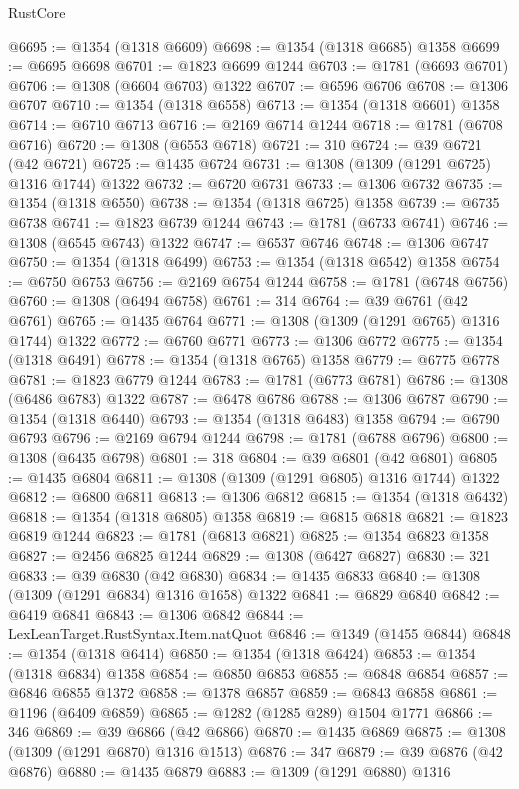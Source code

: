 \begin{lexlean}{RustCore}
\begin{coremodule}
@6695 := @1354 (@1318 @6609)
@6698 := @1354 (@1318 @6685) @1358
@6699 := @6695 @6698
@6701 := @1823 @6699 @1244
@6703 := @1781 (@6693 @6701)
@6706 := @1308 (@6604 @6703) @1322
@6707 := @6596 @6706
@6708 := @1306 @6707
@6710 := @1354 (@1318 @6558)
@6713 := @1354 (@1318 @6601) @1358
@6714 := @6710 @6713
@6716 := @2169 @6714 @1244
@6718 := @1781 (@6708 @6716)
@6720 := @1308 (@6553 @6718)
@6721 := 310
@6724 := @39 @6721 (@42 @6721)
@6725 := @1435 @6724
@6731 := @1308 (@1309 (@1291 @6725) @1316 @1744) @1322
@6732 := @6720 @6731
@6733 := @1306 @6732
@6735 := @1354 (@1318 @6550)
@6738 := @1354 (@1318 @6725) @1358
@6739 := @6735 @6738
@6741 := @1823 @6739 @1244
@6743 := @1781 (@6733 @6741)
@6746 := @1308 (@6545 @6743) @1322
@6747 := @6537 @6746
@6748 := @1306 @6747
@6750 := @1354 (@1318 @6499)
@6753 := @1354 (@1318 @6542) @1358
@6754 := @6750 @6753
@6756 := @2169 @6754 @1244
@6758 := @1781 (@6748 @6756)
@6760 := @1308 (@6494 @6758)
@6761 := 314
@6764 := @39 @6761 (@42 @6761)
@6765 := @1435 @6764
@6771 := @1308 (@1309 (@1291 @6765) @1316 @1744) @1322
@6772 := @6760 @6771
@6773 := @1306 @6772
@6775 := @1354 (@1318 @6491)
@6778 := @1354 (@1318 @6765) @1358
@6779 := @6775 @6778
@6781 := @1823 @6779 @1244
@6783 := @1781 (@6773 @6781)
@6786 := @1308 (@6486 @6783) @1322
@6787 := @6478 @6786
@6788 := @1306 @6787
@6790 := @1354 (@1318 @6440)
@6793 := @1354 (@1318 @6483) @1358
@6794 := @6790 @6793
@6796 := @2169 @6794 @1244
@6798 := @1781 (@6788 @6796)
@6800 := @1308 (@6435 @6798)
@6801 := 318
@6804 := @39 @6801 (@42 @6801)
@6805 := @1435 @6804
@6811 := @1308 (@1309 (@1291 @6805) @1316 @1744) @1322
@6812 := @6800 @6811
@6813 := @1306 @6812
@6815 := @1354 (@1318 @6432)
@6818 := @1354 (@1318 @6805) @1358
@6819 := @6815 @6818
@6821 := @1823 @6819 @1244
@6823 := @1781 (@6813 @6821)
@6825 := @1354 @6823 @1358
@6827 := @2456 @6825 @1244
@6829 := @1308 (@6427 @6827)
@6830 := 321
@6833 := @39 @6830 (@42 @6830)
@6834 := @1435 @6833
@6840 := @1308 (@1309 (@1291 @6834) @1316 @1658) @1322
@6841 := @6829 @6840
@6842 := @6419 @6841
@6843 := @1306 @6842
@6844 := LexLeanTarget.RustSyntax.Item.natQuot
@6846 := @1349 (@1455 @6844)
@6848 := @1354 (@1318 @6414)
@6850 := @1354 (@1318 @6424)
@6853 := @1354 (@1318 @6834) @1358
@6854 := @6850 @6853
@6855 := @6848 @6854
@6857 := @6846 @6855 @1372
@6858 := @1378 @6857
@6859 := @6843 @6858
@6861 := @1196 (@6409 @6859)
@6865 := @1282 (@1285 @289) @1504 @1771
@6866 := 346
@6869 := @39 @6866 (@42 @6866)
@6870 := @1435 @6869
@6875 := @1308 (@1309 (@1291 @6870) @1316 @1513)
@6876 := 347
@6879 := @39 @6876 (@42 @6876)
@6880 := @1435 @6879
@6883 := @1309 (@1291 @6880) @1316

\end{coremodule}
\end{lexlean}
